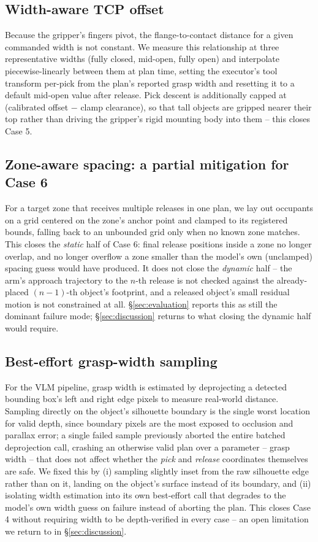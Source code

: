 \subsection{Width-aware TCP offset}

Because the gripper's fingers pivot, the flange-to-contact distance for a
given commanded width is not constant. We measure this relationship at
three representative widths (fully closed, mid-open, fully open) and
interpolate piecewise-linearly between them at plan time, setting the
executor's tool transform per-pick from the plan's reported grasp width
and resetting it to a default mid-open value after release. Pick descent
is additionally capped at (calibrated offset $-$ clamp clearance), so
that tall objects are gripped nearer their top rather than driving the
gripper's rigid mounting body into them -- this closes Case 5.

\subsection{Zone-aware spacing: a partial mitigation for Case 6}
\label{sec:zone-spacing}

For a target zone that receives multiple releases in one plan, we lay out
occupants on a grid centered on the zone's anchor point and clamped to
its registered bounds, falling back to an unbounded grid only when no
known zone matches. This closes the \emph{static} half of Case 6: final
release positions inside a zone no longer overlap, and no longer overflow
a zone smaller than the model's own (unclamped) spacing guess would have
produced. It does not close the \emph{dynamic} half -- the arm's approach
trajectory to the $n$-th release is not checked against the
already-placed $(n-1)$-th object's footprint, and a released object's
small residual motion is not constrained at all. \S\ref{sec:evaluation}
reports this as still the dominant failure mode; \S\ref{sec:discussion}
returns to what closing the dynamic half would require.

\subsection{Best-effort grasp-width sampling}

For the VLM pipeline, grasp width is estimated by deprojecting a detected
bounding box's left and right edge pixels to measure real-world distance.
Sampling directly on the object's silhouette boundary is the single worst
location for valid depth, since boundary pixels are the most exposed to
occlusion and parallax error; a single failed sample previously aborted
the entire batched deprojection call, crashing an otherwise valid plan
over a parameter -- grasp width -- that does not affect whether the
\emph{pick} and \emph{release} coordinates themselves are safe. We fixed
this by (i) sampling slightly inset from the raw silhouette edge rather
than on it, landing on the object's surface instead of its boundary, and
(ii) isolating width estimation into its own best-effort call that
degrades to the model's own width guess on failure instead of aborting
the plan. This closes Case 4 without requiring width to be
depth-verified in every case -- an open limitation we return to in
\S\ref{sec:discussion}.

